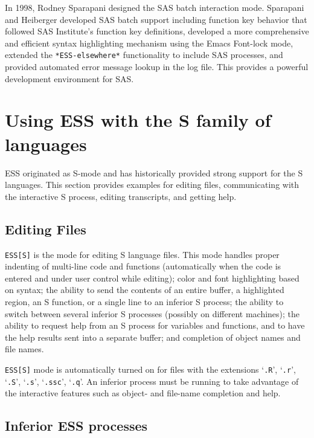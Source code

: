 \documentclass{article}
\newcommand{\stexttt}[1]{{\small\texttt{#1}}}
\newcommand{\file}[1]{`\stexttt{#1}'}
\begin{document}
In 1998, Rodney Sparapani designed the SAS batch interaction mode.
Sparapani and Heiberger developed SAS batch support including function
key behavior that followed SAS Institute's function key definitions,
developed a more comprehensive and efficient syntax highlighting
mechanism using the Emacs Font-lock mode, extended the
\stexttt{*ESS-elsewhere*} functionality to include SAS processes, and
provided automated error message lookup in the log file.  This provides
a powerful development environment for SAS.


\section{Using ESS with the S family of languages}
\label{sec:S}

ESS originated as S-mode and has historically provided strong support
for the S languages.  This section provides examples for editing
files, communicating with the interactive S process, editing
transcripts, and getting help.

\subsection{Editing Files}
\label{sec:S:edit}

\stexttt{ESS[S]} is the mode for editing S language files.  This mode
handles proper indenting of multi-line code and functions
(automatically when the code is entered and under user control while
editing); color and font highlighting based on syntax; the ability to
send the contents of an entire buffer, a highlighted region, an S
function, or a single line to an inferior S process; the ability to
switch between several inferior S processes (possibly on different
machines); the ability to request help from an S process for variables
and functions, and to have the help results sent into a separate
buffer; and completion of object names and file names.

\stexttt{ESS[S]} mode is automatically turned on for files with the
extensions \file{.R}, \file{.r}, \file{.S}, \file{.s}, \file{.ssc},
\file{.q}.  An inferior process must be running to take advantage of
the interactive features such as object- and file-name completion and
help.

\subsection{Inferior ESS processes}
\label{sec:S:inf}
\end{document}
